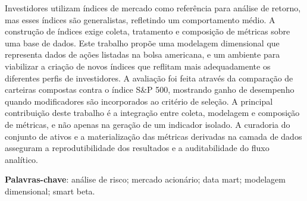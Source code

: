 \begin{resumo}
\begin{SingleSpace}
Investidores utilizam índices de mercado como referência para análise de retorno, mas esses índices são generalistas, refletindo um comportamento médio. A construção de índices exige coleta, tratamento e composição de métricas sobre uma base de dados. Este trabalho propõe uma modelagem dimensional que representa dados de ações listadas na bolsa americana, e um ambiente para viabilizar a criação de novos índices que reflitam mais adequadamente os diferentes perfis de investidores. A avaliação foi feita através da comparação de carteiras compostas contra o índice S\&P 500, mostrando ganho de desempenho quando modificadores são incorporados ao critério de seleção. A principal contribuição deste trabalho é a integração entre coleta, modelagem e composição de métricas, e não apenas na geração de um indicador isolado. A curadoria do conjunto de ativos e a materialização das métricas derivadas na camada de dados asseguram a reprodutibilidade dos resultados e a auditabilidade do fluxo analítico.
\end{SingleSpace}
\vspace{\onelineskip}
\textbf{Palavras-chave}: análise de risco; mercado acionário; data mart; modelagem dimensional; smart beta.
\end{resumo}